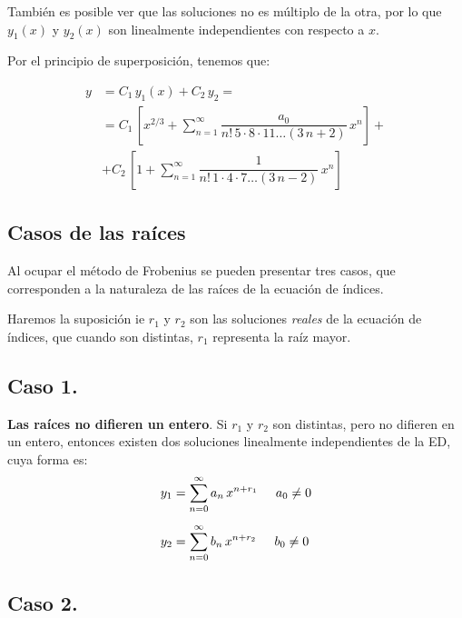 También es posible ver que las soluciones no es múltiplo de la otra, por lo que $y_{1}(x)$ y $y_{2}(x)$ son linealmente independientes con respecto a $x$.

Por el principio de superposición, tenemos que:

\begin{align*}
y &= C_{1} \, y_{1} (x) + C_{2} \, y_{2} = \\[0.5em]
&= C_{1} \, \left[ x^{2/3} + \sum_{n=1}^{\infty} \dfrac{a_{0}}{n! \, 5 \cdot 8 \cdot 11 \ldots (3\, n + 2)} \, x^{n} \right] + \\[0.5em]
&+ C_{2} \, \left[ 1 + \sum_{n=1}^{\infty} \dfrac{1}{n! \, 1 \cdot 4 \cdot 7 \ldots (3\, n - 2)} \, x^{n} \right]
\end{align*}

\subsection{Casos de las raíces}

Al ocupar el método de Frobenius se pueden presentar tres casos, que corresponden a la naturaleza de las raíces de la ecuación de índices.

Haremos la suposición ie $r_{1}$ y $r_{2}$ son las soluciones \emph{reales} de la ecuación de índices, que cuando son distintas, $r_{1}$ representa la raíz mayor.

\subsection*{Caso 1.}

\textbf{Las raíces no difieren un entero}. Si $r_{1}$ y $r_{2}$ son distintas, pero no difieren  en un entero, entonces existen dos soluciones linealmente independientes de la ED, cuya forma es:
\begin{subequations}
\begin{align}
y_{1} &= \sum_{n=0}^{\infty} a_{n} \, x^{n+r_{1}} \hspace{0.5cm} a_{0} \neq 0 \label{eq:ecuacion_14a} \\[0.5em]
y_{2} &= \sum_{n=0}^{\infty} b_{n} \, x^{n+r_{2}} \hspace{0.5cm} b_{0} \neq 0 \label{eq:ecuacion_14b}
\end{align}
\end{subequations}

\subsection*{Caso 2.}


